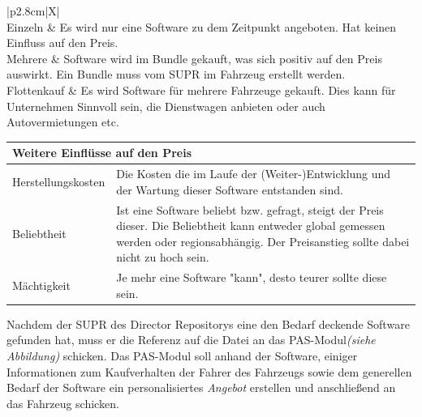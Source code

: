 \begin{center}
	\begin{tabularx}{\linewidth}{|p{2.8cm}|X|}
		\hline
		\\
		\hline
		Einzeln & Es wird nur eine Software zu dem Zeitpunkt angeboten. Hat keinen Einfluss auf den Preis.\\
		\hline
		Mehrere & Software wird im Bundle gekauft, was sich positiv auf den Preis auswirkt. Ein Bundle muss vom SUPR im Fahrzeug erstellt werden.\\[0.5ex]
		\hline
		Flottenkauf & Es wird Software für mehrere Fahrzeuge gekauft. Dies kann für Unternehmen Sinnvoll sein, die Dienstwagen anbieten oder auch Autovermietungen etc.\\
		\hline 
	\end{tabularx}
\end{center}
\begin{center}
	\begin{tabularx}{\linewidth}{|p{2.8cm}|X|}
		\hline
		\multicolumn{2}{|l|}{\textbf{Weitere Einflüsse auf den Preis}}\\
		\hline
		Herstellungskosten & Die Kosten die im Laufe der (Weiter-)Entwicklung und der Wartung dieser Software entstanden sind. \\
		\hline
		Beliebtheit& Ist eine Software beliebt bzw. gefragt, steigt der Preis dieser. Die Beliebtheit kann entweder global gemessen werden oder regionsabhängig. Der Preisanstieg sollte dabei nicht zu hoch sein.\\
		\hline
		Mächtigkeit & Je mehr eine Software "kann", desto teurer sollte diese sein.\\
		\hline
	\end{tabularx}
\end{center}
Nachdem der SUPR des Director Repositorys eine den Bedarf deckende Software gefunden hat, muss er die Referenz auf die Datei an das PAS-Modul\textit{(siehe Abbildung)} schicken. Das PAS-Modul soll anhand der Software, einiger Informationen zum Kaufverhalten der Fahrer des Fahrzeugs sowie dem generellen Bedarf der Software ein personalisiertes \textit{Angebot} erstellen und anschließend an das Fahrzeug schicken.

